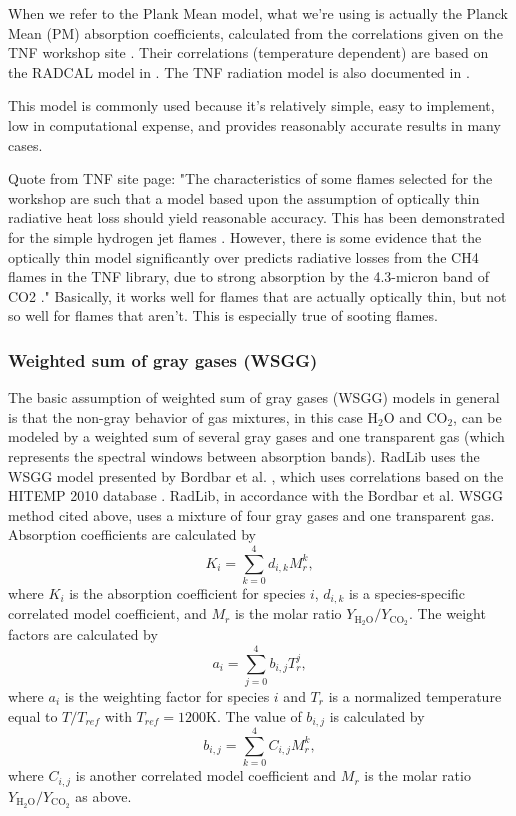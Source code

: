 \documentclass[preprint,12pt, a4paper]{elsarticle}
\begin{document}
When we refer to the Plank Mean model, what we're using is actually the Planck Mean (PM) absorption coefficients, calculated from the correlations given on the TNF workshop site \citep{Smith_2003}. Their correlations (temperature dependent) are based on the RADCAL model in \citep{Grosshandler_1993}. The TNF radiation model is also documented in \citep{Barlow_2001}.

This model is commonly used because it's relatively simple, easy to implement, low in computational expense, and provides reasonably accurate results in many cases. 

Quote from TNF site page: "The characteristics of some flames selected for the workshop are such that a model based upon the assumption of optically thin radiative heat loss should yield reasonable accuracy. This has been demonstrated for the simple hydrogen jet flames \cite{Barlow_1999}. However, there is some evidence that the optically thin model significantly over predicts radiative losses from the CH4 flames in the TNF library, due to strong absorption by the 4.3-micron band of CO2 \cite{Frank_2000,Zhu_2002,Coelho_2002}." Basically, it works well for flames that are actually optically thin, but not so well for flames that aren't. This is especially true of sooting flames. 

\subsubsection{Weighted sum of gray gases (WSGG)}
\label{s:wsgg}
The basic assumption of weighted sum of gray gases (WSGG) models in general is that the non-gray behavior of gas mixtures, in this case H$_2$O and CO$_2$, can be modeled by a weighted sum of several gray gases and one transparent gas (which represents the spectral windows between absorption bands). 
RadLib uses the WSGG model presented by Bordbar et al. \citep{Bordbar_2014,Bordbar_2020}, which uses correlations based on the HITEMP 2010 database \cite{Rothman_2010}. RadLib, in accordance with the Bordbar et al. WSGG method cited above, uses a mixture of four gray gases and one transparent gas. Absorption coefficients are calculated by 
\begin{equation}
 K_i=\sum_{k=0}^{4}d_{i,k}M_r^k,
\end{equation}
where $K_i$ is the absorption coefficient for species $i$, $d_{i,k}$ is a species-specific correlated model coefficient, and $M_r$ is the molar ratio $Y_{\mathrm{H_2O}}/Y_{\mathrm{CO_2}}$. The weight factors are calculated by 
\begin{equation}
 a_i=\sum_{j=0}^{4}b_{i,j}T_r^j,
\end{equation}
where $a_i$ is the weighting factor for species $i$ and $T_r$ is a normalized temperature equal to $T/T_{ref}$ with $T_{ref}=1200$K. The value of $b_{i,j}$ is calculated by 
\begin{equation}
 b_{i,j}=\sum_{k=0}^{4}C_{i,j}M_r^k,
\end{equation}
where $C_{i,j}$ is another correlated model coefficient and $M_r$ is the molar ratio $Y_{\mathrm{H_2O}}/Y_{\mathrm{CO_2}}$ as above. 
\end{document}
